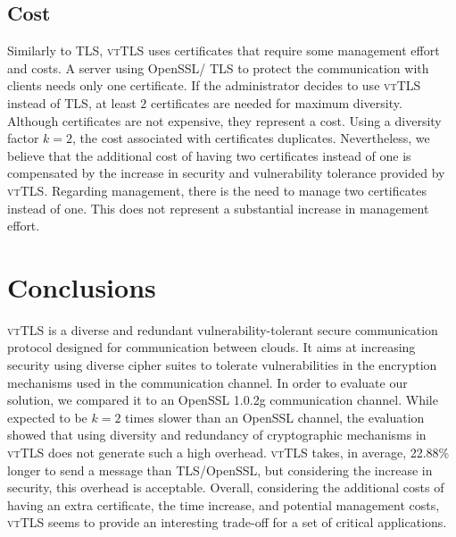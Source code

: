 \documentclass{sig-alternate-05-2015}
\newcommand{\suite}[1]{\texttt{{\footnotesize #1}}}
\begin{document}
\subsection{Cost}

Similarly to TLS, \textsc{vtTLS} uses certificates that require some management effort and costs.
A server using OpenSSL/ TLS to protect the communication with clients needs only one certificate. If the administrator decides to use \textsc{vtTLS} instead of TLS, at least $2$ certificates are needed for maximum diversity.
Although certificates are not  expensive, they represent a cost. %
%
Using a diversity factor $k = 2$, the cost associated with certificates duplicates. Nevertheless, we believe that the additional cost of having two certificates instead of one is compensated by the increase in security and vulnerability tolerance provided by \textsc{vtTLS}.
%
Regarding management, there is the need to manage two certificates instead of one. This does not represent a substantial increase in management effort. %



\section{Conclusions}
\label{sec-conclusions}

\textsc{vtTLS} is a diverse and redundant vulnerability-tolerant secure communication protocol designed for communication between clouds. It aims at increasing security using  diverse cipher suites to tolerate vulnerabilities in the encryption mechanisms used in the communication channel. 
In order to evaluate our solution, we compared it to an OpenSSL 1.0.2g communication channel. While expected to be $k = 2$ times slower than an OpenSSL channel, the evaluation showed that using diversity and redundancy of cryptographic mechanisms in \textsc{vtTLS} does not generate such a high overhead. \textsc{vtTLS} takes, in average, 22.88\% longer to send a message than TLS/OpenSSL, but considering the increase in security, this overhead is acceptable.
Overall, considering the additional costs of having an extra certificate, the time increase, and potential management costs,  \textsc{vtTLS} seems to provide an interesting trade-off for a set of critical applications.
\end{document}
